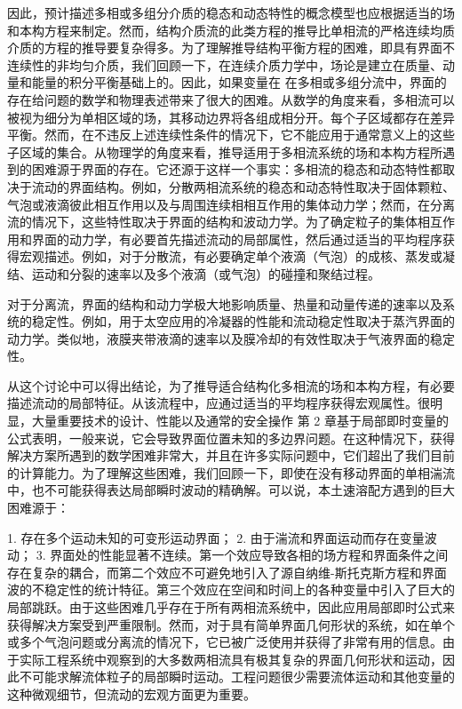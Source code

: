 \documentclass[11pt,a4paper,openany,fontset=none]{ctexbook}
\begin{document}
因此，预计描述多相或多组分介质的稳态和动态特性的概念模型也应根据适当的场和本构方程来制定。然而，结构介质流的此类方程的推导比单相流的严格连续均质介质的方程的推导要复杂得多。为了理解推导结构平衡方程的困难，即具有界面不连续性的非均匀介质，我们回顾一下，在连续介质力学中，场论是建立在质量、动量和能量的积分平衡基础上的。因此，如果变量在
在多相或多组分流中，界面的存在给问题的数学和物理表述带来了很大的困难。从数学的角度来看，多相流可以被视为细分为单相区域的场，其移动边界将各组成相分开。每个子区域都存在差异平衡。然而，在不违反上述连续性条件的情况下，它不能应用于通常意义上的这些子区域的集合。从物理学的角度来看，推导适用于多相流系统的场和本构方程所遇到的困难源于界面的存在。它还源于这样一个事实：多相流的稳态和动态特性都取决于流动的界面结构。例如，分散两相流系统的稳态和动态特性取决于固体颗粒、气泡或液滴彼此相互作用以及与周围连续相相互作用的集体动力学；然而，在分离流的情况下，这些特性取决于界面的结构和波动力学。为了确定粒子的集体相互作用和界面的动力学，有必要首先描述流动的局部属性，然后通过适当的平均程序获得宏观描述。例如，对于分散流，有必要确定单个液滴（气泡）的成核、蒸发或凝结、运动和分裂的速率以及多个液滴（或气​​泡）的碰撞和聚结过程。

对于分离流，界面的结构和动力学极大地影响质量、热量和动量传递的速率以及系统的稳定性。例如，用于太空应用的冷凝器的性能和流动稳定性取决于蒸汽界面的动力学。类似地，液膜夹带液滴的速率以及膜冷却的有效性取决于气液界面的稳定性。

从这个讨论中可以得出结论，为了推导适合结构化多相流的场和本构方程，有必要描述流动的局部特征。从该流程中，应通过适当的平均程序获得宏观属性。很明显，大量重要技术的设计、性能以及通常的安全操作
第 2 章基于局部即时变量的公式表明，一般来说，它会导致界面位置未知的多边界问题。在这种情况下，获得解决方案所遇到的数学困难非常大，并且在许多实际问题中，它们超出了我们目前的计算能力。为了理解这些困难，我们回顾一下，即使在没有移动界面的单相湍流中，也不可能获得表达局部瞬时波动的精确解。可以说，本土速溶配方遇到的巨大困难源于：

1. 存在多个运动未知的可变形运动界面； 2. 由于湍流和界面运动而存在变量波动； 3. 界面处的性能显著不连续。第一个效应导致各相的场方程和界面条件之间存在复杂的耦合，而第二个效应不可避免地引入了源自纳维-斯托克斯方程和界面波的不稳定性的统计特征。第三个效应在空间和时间上的各种变量中引入了巨大的局部跳跃。由于这些困难几乎存在于所有两相流系统中，因此应用局部即时公式来获得解决方案受到严重限制。然而，对于具有简单界面几何形状的系统，如在单个或多个气泡问题或分离流的情况下，它已被广泛使用并获得了非常有用的信息。由于实际工程系统中观察到的大多数两相流具有极其复杂的界面几何形状和运动，因此不可能求解流体粒子的局部瞬时运动。工程问题很少需要流体运动和其他变量的这种微观细节，但流动的宏观方面更为重要。
\end{document}
